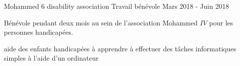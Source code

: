 

\begin{cventries}
  \cventry
    {Mohammed 6 disability association} %
    {Travail bénévole
    } %
       {} %
    { Mars 2018 - Juin 2018
    	} %
    {
      \begin{cvitems} %
        \item { Bénévole pendant deux mois au sein de l'association Mohammed $IV$  pour les personnes handicapées.
  \item {aide des enfants handicapées à apprendre à effectuer des tâches informatiques simples à l'aide d'un ordinateur }
        }
      \end{cvitems}
    }

\end{cventries}
